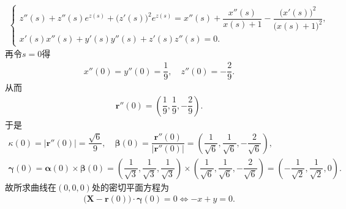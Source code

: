 \documentclass[../../main.tex]{subfiles}%
\begin{document}
\begin{solution}
\begin{align*}
\begin{cases}
z''(s) + z''(s)e^{z(s)} + \big(z'(s)\big)^2e^{z(s)} = x''(s) + \dfrac{x''(s)}{x(s) + 1} - \dfrac{\big(x'(s)\big)^2}{\big(x(s) + 1\big)^2}, \\
x'(s)x''(s) + y'(s)y''(s) + z'(s)z''(s) = 0.
\end{cases}
\end{align*}
再令$s=0$得
\begin{align*}
x''(0) = y''(0) = \dfrac{1}{9}, \quad z''(0) = -\dfrac{2}{9}.
\end{align*}
从而
\begin{align*}
\bm{r}''(0) = \left( \dfrac{1}{9}, \dfrac{1}{9}, -\dfrac{2}{9} \right).
\end{align*}
于是
\begin{gather*}
\kappa(0) = \big| \bm{r}''(0) \big| = \dfrac{\sqrt{6}}{9}, \quad
\bm{\beta}(0) = \dfrac{\bm{r}''(0)}{\big| \bm{r}''(0) \big|} = \left( \dfrac{1}{\sqrt{6}}, \dfrac{1}{\sqrt{6}}, -\dfrac{2}{\sqrt{6}} \right), \\
\bm{\gamma}(0) = \bm{\alpha}(0) \times \bm{\beta}(0) = \left( \dfrac{1}{\sqrt{3}}, \dfrac{1}{\sqrt{3}}, \dfrac{1}{\sqrt{3}} \right) \times \left( \dfrac{1}{\sqrt{6}}, \dfrac{1}{\sqrt{6}}, -\dfrac{2}{\sqrt{6}} \right) = \left( -\dfrac{1}{\sqrt{2}}, \dfrac{1}{\sqrt{2}}, 0 \right).
\end{gather*}
故所求曲线在$(0,0,0)$处的密切平面方程为
\begin{align*}
\big( \bm{X} - \bm{r}(0) \big) \cdot \bm{\gamma}(0) = 0 \Longleftrightarrow -x + y = 0.
\end{align*}

\end{solution}
\end{document}
